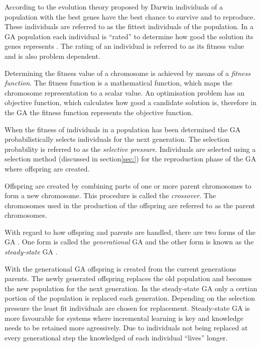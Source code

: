 According to the evolution theory proposed by Darwin individuals of a population with the best genes have the best chance to survive and to reproduce\cite{CompuIntelligenceIntro}. These individuals are referred to as the fittest individuals of the population. In a \gls{GA} population each individual is ``rated'' to determine how good the solution its genes represents \cite{CompuIntelligenceIntro}. The rating of an individual is referred to as its fitness value and is also problem dependent\cite{CompuIntelligenceIntro}.

Determining the fitness value of a chromosome is achieved by means of a \emph{fitness function}. The fitness function is a mathematical function, which maps the chromosome representation to a scalar value\cite{CompuIntelligenceIntro}. An optimisation problem has an objective function, which calculates how good a candidate solution is, therefore in the \gls{GA} the fitness function represents the objective function\cite{CompuIntelligenceIntro}.

When the fitness of individuals in a population has been determined the \gls{GA} probabilistically selects individuals for the next generation\cite{CompuIntelligenceIntro}. The selection probability is referred to as the \emph{selective pressure}\cite{CompuIntelligenceIntro}. Individuals are selected using a selection method (discussed in section\ref{sec:}) for the reproduction phase of the \gls{GA} where offspring are created\cite{CompuIntelligenceIntro}.

Offspring are created by combining parts of one or more parent chromosomes to form a new chromosome. This procedure is called the \emph{crossover}\cite{CompuIntelligenceIntro}. The chromosomes used in the production of the offspring are referred to as the parent chromosomes\cite{CompuIntelligenceIntro}.

With regard to how offspring and parents are handled, there are two forms of the \gls{GA} \cite{FamilyGA}. One form is called the \emph{generational} \gls{GA}  and the other form is known as the \emph{steady-state} \gls{GA} \cite{GeostatisticalGA,FamilyGA}.

With the generational \gls{GA} offspring is created from the current generations parents. The newly generated offspring replaces the old population and becomes the new population for the next generation\cite{FamilyGA, SpringerIntroToGAs, IntroToGAs}. In the steady-state \gls{GA} only a certian portion of the population is replaced each generation. Depending on the selection pressure the least fit individuals are chosen for replacement\cite{GeostatisticalGA,FamilyGA, SpringerIntroToGAs, IntroToGAs}. Steady-state \gls{GA} is more favourable for systems where incremental learning is key and knowledge needs to be retained more agressively\cite{SpringerIntroToGAs, IntroToGAs}. Due to individuals not being replaced at every generational step the knowledged of each individual ``lives'' longer\cite{SpringerIntroToGAs, IntroToGAs}.

